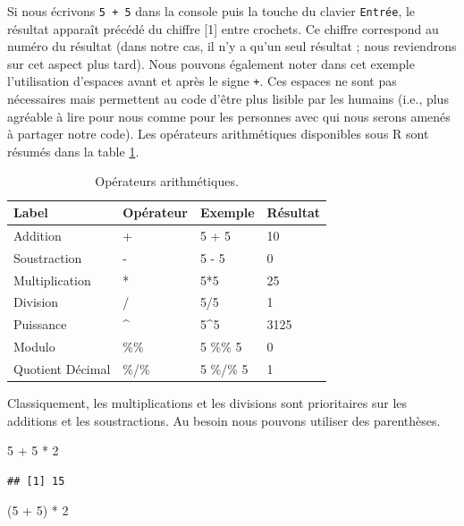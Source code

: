 \documentclass[twoside,symmetric]{book}
\newenvironment{Shaded}{}{}
\newcommand{\DecValTok}[1]{#1}
\newcommand{\NormalTok}[1]{#1}
\newcommand{\OperatorTok}[1]{#1}
\newcommand{\StringTok}[1]{#1}
\begin{document}
Si nous écrivons \texttt{5\ +\ 5} dans la console puis la touche du clavier \texttt{Entrée}, le résultat apparaît précédé du chiffre {[}1{]} entre crochets. Ce chiffre correspond au numéro du résultat (dans notre cas, il n'y a qu'un seul résultat ; nous reviendrons sur cet aspect plus tard). Nous pouvons également noter dans cet exemple l'utilisation d'espaces avant et après le signe \texttt{+}. Ces espaces ne sont pas nécessaires mais permettent au code d'être plus lisible par les humains (i.e., plus agréable à lire pour nous comme pour les personnes avec qui nous serons amenés à partager notre code).
Les opérateurs arithmétiques disponibles sous R sont résumés dans la table \ref{tab:tabOpAri}.

\begin{table}

\caption{\label{tab:tabOpAri}Opérateurs arithmétiques.\label{tab:tabOpAri}}
\centering
\begin{tabular}[t]{l|l|l|l}
\hline
Label & Opérateur & Exemple & Résultat\\
\hline
Addition & + & 5 + 5 & 10\\
\hline
Soustraction & - & 5 - 5 & 0\\
\hline
Multiplication & * & 5*5 & 25\\
\hline
Division & / & 5/5 & 1\\
\hline
Puissance & \textasciicircum{} & 5\textasciicircum{}5 & 3125\\
\hline
Modulo & \%\% & 5 \%\% 5 & 0\\
\hline
Quotient Décimal & \%/\% & 5 \%/\% 5 & 1\\
\hline
\end{tabular}
\end{table}

Classiquement, les multiplications et les divisions sont prioritaires sur les additions et les soustractions. Au besoin nous pouvons utiliser des parenthèses.

\begin{Shaded}
\begin{Highlighting}[]
\DecValTok{5} \OperatorTok{+}\StringTok{ }\DecValTok{5} \OperatorTok{*}\StringTok{ }\DecValTok{2}
\end{Highlighting}
\end{Shaded}

\begin{verbatim}
## [1] 15
\end{verbatim}

\begin{Shaded}
\begin{Highlighting}[]
\NormalTok{(}\DecValTok{5} \OperatorTok{+}\StringTok{ }\DecValTok{5}\NormalTok{) }\OperatorTok{*}\StringTok{ }\DecValTok{2}
\end{Highlighting}
\end{Shaded}
\end{document}
